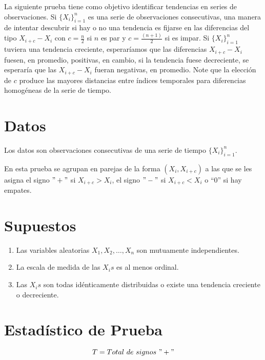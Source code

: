 \documentclass[
  a4paper,
  oneside,
  openany]{book}
\begin{document}
La siguiente prueba tiene como objetivo identificar tendencias en series de observaciones.
Si \(\{X_{i}\}^{n}_{i=1}\) es una serie de observaciones consecutivas, una manera de
intentar descubrir si hay o no una tendencia es fijarse en las diferencias del tipo \(X_{i+c} - X_{i}\) con \(c = \frac{n}{2}\) si \(n\) es par y \(c =\frac{(n + 1)}{2}\) si es impar.
Si \(\{X_{i}\}^{n}_{i=1}\) tuviera una tendencia creciente, esperaríamos que las diferencias \(X_{i+c} - X_{i}\) fuesen, en promedio, positivas, en cambio, si la tendencia fuese decreciente, se esperaría que las \(X_{i+c} - X_{i}\) fueran negativas, en promedio.
Note que la elección de \(c\) produce las mayores distancias entre índices temporales para diferencias homogéneas de la serie de tiempo.

\hypertarget{datos-4}{%
\section{Datos}\label{datos-4}}

Los datos son observaciones consecutivas de una serie de tiempo \(\{X_{i}\}^{n}_{i=1}\).

En esta prueba se agrupan en parejas de la forma \((X_{i},X_{i+c})\) a las que se les asigna el signo \("+"\) si \(X_{i+c} > X_{i}\), el signo \("-"\) si \(X_{i+c} < X_{i}\) o ``0'' si hay empates.

\hypertarget{supuestos-4}{%
\section{Supuestos}\label{supuestos-4}}

\begin{enumerate}
\def\labelenumi{\arabic{enumi})}
\item
  Las variables aleatorias \(X_{1}, X_{2}, \ldots, X_{n}\) son mutuamente independientes.
\item
  La escala de medida de las \(X_{i}s\) es al menos ordinal.
\item
  Las \(X_{i}s\) son todas idénticamente distribuidas o existe una tendencia creciente o decreciente.
\end{enumerate}

\hypertarget{estaduxedstico-de-prueba-4}{%
\section{Estadístico de Prueba}\label{estaduxedstico-de-prueba-4}}

\[T=Total\ de\ signos\ "+"\]
\end{document}
